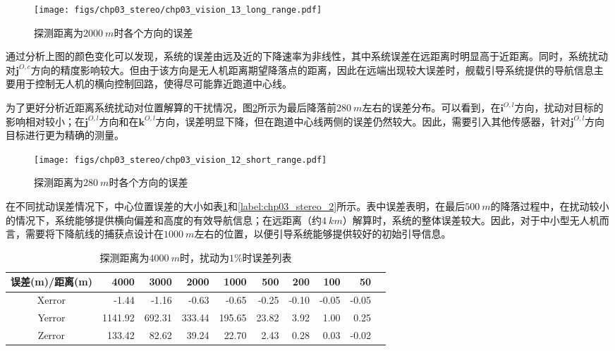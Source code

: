 \begin{figure}[htb]
\centering
\texttt{[image: figs/chp03\_stereo/chp03\_vision\_13\_long\_range.pdf]}	
\caption{探测距离为$2000\ m$时各个方向的误差}
\label{fig:chp03_vision_13_long_range}
\end{figure}
通过分析上图的颜色变化可以发现，系统的误差由远及近的下降速率为非线性，其中系统误差在远距离时明显高于近距离。同时，系统扰动对$\mathbf{j}^{O,c}$方向的精度影响较大。但由于该方向是无人机距离期望降落点的距离，因此在远端出现较大误差时，舰载引导系统提供的导航信息主要用于控制无人机的横向控制回路，使得尽可能靠近跑道中心线。

为了更好分析近距离系统扰动对位置解算的干扰情况，图\ref{fig:chp03_vision_12_short_range}所示为最后降落前$280\ m$左右的误差分布。可以看到，在$\mathbf{i}^{O,l}$方向，扰动对目标的影响相对较小；在$\mathbf{j}^{O,l}$方向和在$\mathbf{k}^{O,l}$方向，误差明显下降，但在跑道中心线两侧的误差仍然较大。因此，需要引入其他传感器，针对$\mathbf{j}^{O,l}$方向目标进行更为精确的测量。

\begin{figure}[htb]
	\centering
	\texttt{[image: figs/chp03\_stereo/chp03\_vision\_12\_short\_range.pdf]}	
	\caption{探测距离为$280\ m$时各个方向的误差}
	\label{fig:chp03_vision_12_short_range}
\end{figure}


在不同扰动误差情况下，中心位置误差的大小如表\ref{label:chp03_stereo_1}和\ref{label:chp03_stereo_2}所示。表中误差表明，在最后$500\ m$的降落过程中，在扰动较小的情况下，系统能够提供横向偏差和高度的有效导航信息；在远距离（约$4\ km$）解算时，系统的整体误差较大。因此，对于中小型无人机而言，需要将下降航线的捕获点设计在$1000\ m$左右的位置，以便引导系统能够提供较好的初始引导信息。
\begin{table}[htb]
	\centering
	\caption{探测距离为$4000\ m$时，扰动为$1\%$时误差列表}
	\label{label:chp03_stereo_1}
	\begin{tabular}{crrrrrrrrr}
		\hline
		误差(m)/距离(m)     & 4000    & 3000   & 2000     & 1000  & 500   & 200   & 100   & 50     \\ \hline
		Xerror  & -1.44   & -1.16  & -0.63  & -0.65   & -0.25 & -0.10 & -0.05 & -0.05\\ 
		Yerror  & 1141.92 & 692.31 & 333.44 & 195.65  & 23.82 & 3.92  & 1.00  & 0.25   \\
		Zerror  & 133.42  & 82.62  & 39.24  & 22.70   & 2.43  & 0.28  & 0.03  & -0.02  \\ \hline
		
	\end{tabular}
\end{table}


